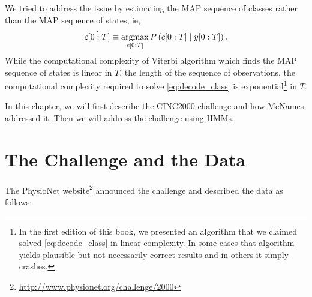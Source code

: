 We tried to address the issue by estimating the MAP sequence of classes
rather than the MAP sequence of states, ie,
\begin{equation}
  \label{eq:decode_class}
  \hat {c[0:T]} \equiv
  \operatorname*{argmax}_{c[0:T]}P\left(c[0:T] \mid  y[0:T]\right).
\end{equation}
While the computational complexity of Viterbi algorithm which finds
the MAP sequence of states is linear in $T$, the length of the
sequence of observations, the computational complexity required to
solve \eqref{eq:decode_class} is exponential\footnote{In the first
  edition of this book, we presented an algorithm that we claimed solved
  \eqref{eq:decode_class} in linear complexity.  In some cases that
  algorithm yields plausible but not necessarily correct results and
  in others it simply crashes.} in $T$.

In this chapter, we will first describe the CINC2000 challenge and how
McNames addressed it.  Then we will address the challenge using HMMs.

\section{The  Challenge and the Data}
\label{sec:challenge}

The PhysioNet
website\footnote{\url{http://www.physionet.org/challenge/2000}}
announced the challenge and described the data as follows:

